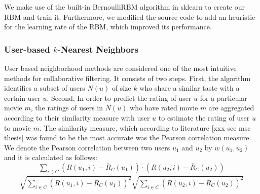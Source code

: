 \documentclass[10pt,conference,compsocconf]{IEEEtran}
\begin{document}
We make use of the built-in BernoulliRBM algorithm in sklearn to create our RBM and train it. Furthermore, we modified the source code to add an heuristic for the learning rate of the RBM, which improved its performance.

\subsubsection*{\textbf{User-based $k$-Nearest Neighbors}} User based neighborhood methods are considered one of the most intuitive methods for collaborative filtering. It consists of two steps. First, the algorithm identifies a subset of users $N(u)$ of size $k$ who share a similar taste with a certain user $u$. Second, In order to predict the rating of user $u$ for a particular movie $m$, the ratings of users in $N(u)$ who have rated movie $m$ are aggregated according to their similarity measure with user $u$ to estimate the rating of user $u$ to movie $m$. The similarity measure, which according to literature [xxx see msc thesis] was found to be the most accurate was the Pearson correlation measure. We denote the Pearson correlation between two users $u_1$ and $u_2$ by $w(u_1, u_2)$ and it is calculated as follows:
\begin{equation} \label{eqn:pearson}
\frac{\sum_{i \in C} (R(u_1, i) - \overline{R}_C(u_1))\cdot(R(u_2, i) - \overline{R}_C(u_2))}{\sqrt{\sum_{i \in C} (R(u_1, i) - \overline{R}_C(u_1))^2} \sqrt{\sum_{i \in C} (R(u_2, i) - \overline{R}_C(u_2))^2}}
\end{equation}
\end{document}
